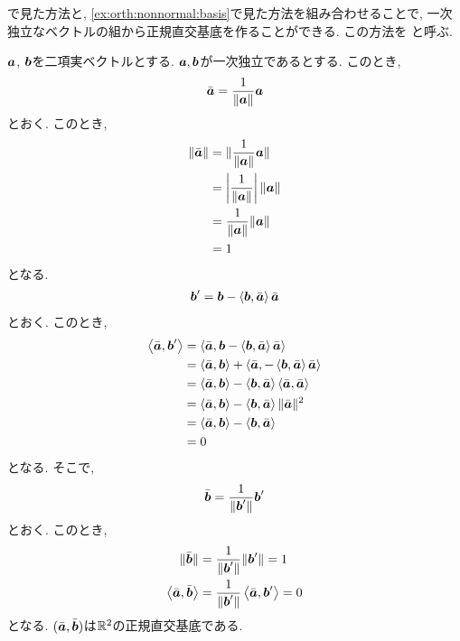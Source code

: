 \begin{remark}
  \label{thm:gramschmidt}
  で見た方法と,
  \cref{ex:orth:nonnormal:basis}で見た方法を組み合わせることで,
  一次独立なベクトルの組から正規直交基底を作ることができる.
  この方法を
  と呼ぶ.
  
  $\aaa$, $\bbb$を二項実ベクトルとする.
  $\aaa,\bbb$が一次独立であるとする.
  このとき,
  \begin{align*}
    \bar\aaa=\frac{1}{\|\aaa\|}\aaa
  \end{align*}
  とおく. このとき,
  \begin{align*}
    \|\bar\aaa\|
    &=\|\frac{1}{\|\aaa\|}\aaa\|\\
    &=\left|\frac{1}{\|\aaa\|}\right|\|\aaa\|\\
    &=\frac{1}{\|\aaa\|}\|\aaa\|\\
    &=1
  \end{align*}
  となる.
  \begin{align*}
    \bbb'=\bbb-\Braket{\bbb,\bar\aaa}\bar\aaa
  \end{align*}
  とおく. このとき,
  \begin{align*}
    \Braket{\bar\aaa,\bbb'}
    &=\Braket{\bar\aaa,\bbb-\Braket{\bbb,\bar\aaa}\bar\aaa}\\
    &=\Braket{\bar\aaa,\bbb}+\Braket{\bar\aaa,-\Braket{\bbb,\bar\aaa}\bar\aaa}\\
    &=\Braket{\bar\aaa,\bbb}-\Braket{\bbb,\bar\aaa}\Braket{\bar\aaa,\bar\aaa}\\
    &=\Braket{\bar\aaa,\bbb}-\Braket{\bbb,\bar\aaa}\|\bar\aaa\|^2\\
    &=\Braket{\bar\aaa,\bbb}-\Braket{\bbb,\bar\aaa}\\
    &=0
  \end{align*}
  となる.  そこで,
  \begin{align*}
    \bar\bbb=\frac{1}{\|\bbb'\|}\bbb'
  \end{align*}
  とおく.  このとき,
  \begin{align*}
    \|\bar\bbb\|&=\frac{1}{\|\bbb'\|}\|\bbb'\|=1\\
    \Braket{\bar\aaa,\bar\bbb}&=\frac{1}{\|\bbb'\|}\Braket{\bar\aaa,\bbb'}=0
  \end{align*}
  となる.
  $(\bar\aaa,\bar\bbb)$は$\RR^2$の正規直交基底である.
\end{remark}

